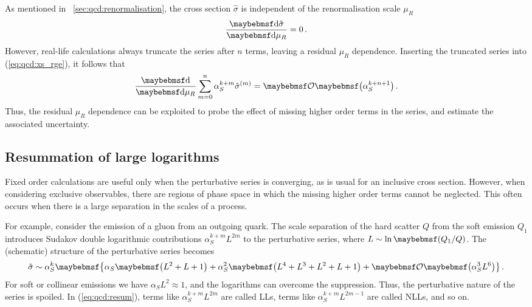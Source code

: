 As mentioned in \Section~\ref{sec:qcd:renormalisation}, the cross section $\hat{\sigma}$ 
is independent of the renormalisation scale $\mu_R$
\begin{equation}
	\frac{\d{\hat{\sigma}}}{\d{\mu_R}} = 0 \,.
	\label{eq:qcd:xs_rge}
\end{equation}
However, real-life calculations always truncate the series after $n$ terms, leaving a 
residual $\mu_R$ dependence. Inserting the truncated series into (\ref{eq:qcd:xs_rge}), 
it follows that
\begin{equation}
	\frac{\d{}}{\d{\mu_R}} \sum\limits_{m=0}^{n} \alpha_S^{k+m} \hat{\sigma}^{(m)}
	= \ofOrder{\alpha_S^{k+n+1}} \,.
\end{equation}
Thus, the residual $\mu_R$ dependence can be exploited to probe the effect of missing 
higher order terms in the series, and estimate the associated uncertainty.




\subsection{Resummation of large logarithms}
\label{sec:qcd:resum}

Fixed order calculations are useful only when the perturbative series is converging, as is
usual for an inclusive cross section. However, when considering exclusive observables, 
there are regions of phase space in which the missing higher order terms cannot be 
neglected. This often occurs when there is a large separation in the scales of a process.

For example, consider the emission of a gluon from an outgoing quark. The scale 
separation of the hard scatter $Q$ from the soft emission $Q_1$ introduces Sudakov double 
logarithmic contributions $\alpha_S^{k+m} L^{2m}$ to the perturbative series, where 
$L \sim \ln\parenths{Q_1 / Q}$. The (schematic) structure of the perturbative series 
becomes
\begin{equation}
	\hat{\sigma} \sim \alpha_S^k \braces{\alpha_S \parenths{L^2 + L + 1}
	+ \alpha_S^2 \parenths{L^4 + L^3 + L^2 + L + 1} + \ofOrder{\alpha_S^3 L^6}} \,.
	\label{eq:qcd:resum}
\end{equation}
For soft or collinear emissions we have $\alpha_S L^2 \approx 1$, and the logarithms can 
overcome the \alphaS suppression. Thus, the perturbative nature of the series is spoiled. 
In (\ref{eq:qcd:resum}), terms like $\alpha_S^{k+m} L^{2m}$ are called \acp{LL}, terms 
like $\alpha_S^{k+m} L^{2m-1}$ are called \acp{NLL}, and so on.

